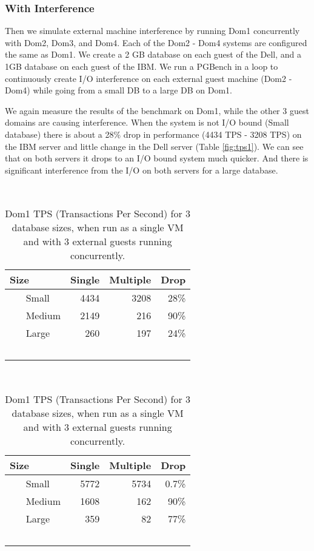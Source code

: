 \subsubsection{With Interference}
Then we simulate external machine interference by running Dom1 concurrently with Dom2, Dom3, and Dom4. Each of the Dom2 - Dom4 systems are configured the same as Dom1.  We create a 2 GB database on each guest of the Dell, and a 1GB database on each guest of the IBM.  We run a PGBench in a loop to continuously create I/O interference on each external guest machine (Dom2 - Dom4) while going from a small DB to a large DB on Dom1.

 We again measure the results of the benchmark on Dom1, while the other 3 guest domains are causing interference.  When the system is not I/O bound (Small database) there is about a 28\% drop in performance (4434 TPS - 3208 TPS) on the IBM server and little change in the Dell server (Table \ref{fig:tps1}).  We can see that on both servers it drops to an I/O bound system much quicker.  And there is significant interference from the I/O on both servers for a large database.

\begin{table}[h]
\begin{subtable}[h]{0.45\textwidth}
  \begin{tabular}{ l | r | r | r }
    Size & Single & Multiple & Drop \\
    \hline
    Small & 4434 & 3208 & 28\% \\ \hline
    Medium & 2149 & 216 & 90\% \\ \hline
    Large & 260 & 197 & 24\% \\  \hline
    \hline
  \end{tabular}
\caption{Small Server with 2GB RAM:  Each Guest domain has 512MB Allocated.}
\label{fig:tps1}
\end{subtable}
\hfill
\begin{subtable}[h]{0.45\textwidth}
  \begin{tabular}{ l | r | r | r }
    Size & Single & Multiple & Drop \\
    \hline
    Small & 5772 & 5734 & 0.7\% \\ \hline
    Medium & 1608 & 162 & 90\% \\ \hline
    Large & 359 & 82 & 77\% \\  \hline
    \hline
  \end{tabular}
\caption{Medium Server with 8GB RAM:  Each Guest domain has 2GB Allocated. }
\label{fig:tps2}
\end{subtable}
\caption{Dom1 TPS (Transactions Per Second) for 3 database sizes, when run as a single VM and with 3 external guests running concurrently.}
\end{table}

